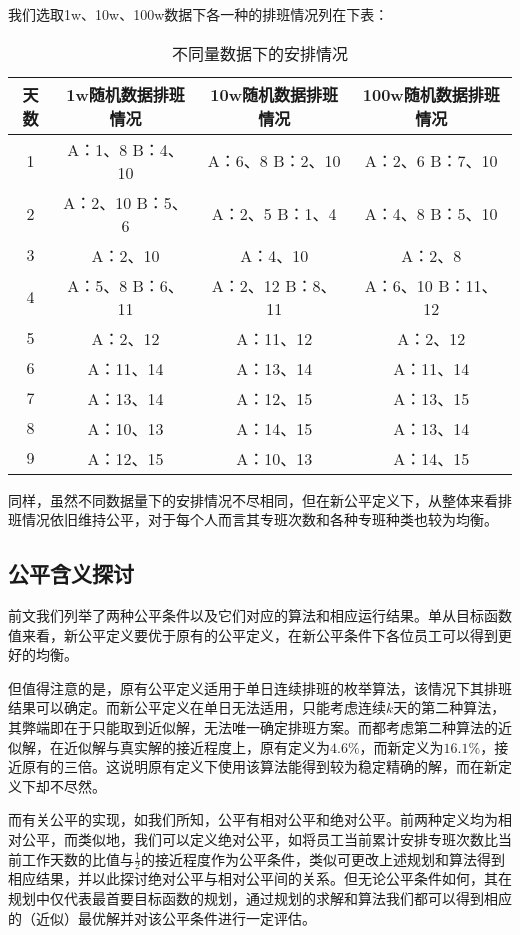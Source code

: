 \documentclass{article}
\begin{document}
	我们选取1w、10w、100w数据下各一种的排班情况列在下表：
	\begin{table}[!h]
		\centering
		\caption{不同量数据下的安排情况}
		\begin{tabular}{|c|c|c|c|}
			\hline
			天数 & 1w随机数据排班情况   & 10w随机数据排班情况   & 100w随机数据排班情况   \\
			\hline
			1  & A：1、8 B：4、10 & A：6、8 B：2、10  & A：2、6 B：7、10   \\
			2  & A：2、10 B：5、6 & A：2、5 B：1、4   & A：4、8 B：5、10   \\
			3  & A：2、10       & A：4、10        & A：2、8          \\
			4  & A：5、8 B：6、11 & A：2、12 B：8、11 & A：6、10 B：11、12 \\
			5  & A：2、12       & A：11、12       & A：2、12         \\
			6  & A：11、14      & A：13、14       & A：11、14        \\
			7  & A：13、14      & A：12、15       & A：13、15        \\
			8  & A：10、13      & A：14、15       & A：13、14        \\
			9  & A：12、15      & A：10、13       & A：14、15       \\
			\hline
		\end{tabular}
	\end{table}
	
	同样，虽然不同数据量下的安排情况不尽相同，但在新公平定义下，从整体来看排班情况依旧维持公平，对于每个人而言其专班次数和各种专班种类也较为均衡。
	
	\subsection{公平含义探讨}
	前文我们列举了两种公平条件以及它们对应的算法和相应运行结果。单从目标函数值来看，新公平定义要优于原有的公平定义，在新公平条件下各位员工可以得到更好的均衡。
	
	但值得注意的是，原有公平定义适用于单日连续排班的枚举算法，该情况下其排班结果可以确定。而新公平定义在单日无法适用，只能考虑连续$k$天的第二种算法，其弊端即在于只能取到近似解，无法唯一确定排班方案。而都考虑第二种算法的近似解，在近似解与真实解的接近程度上，原有定义为$4.6\%$，而新定义为$16.1\%$，接近原有的三倍。这说明原有定义下使用该算法能得到较为稳定精确的解，而在新定义下却不尽然。
	
	而有关公平的实现，如我们所知，公平有相对公平和绝对公平。前两种定义均为相对公平，而类似地，我们可以定义绝对公平，如将员工当前累计安排专班次数比当前工作天数的比值与$\frac{1}{2}$的接近程度作为公平条件，类似可更改上述规划和算法得到相应结果，并以此探讨绝对公平与相对公平间的关系。但无论公平条件如何，其在规划中仅代表最首要目标函数的规划，通过规划的求解和算法我们都可以得到相应的（近似）最优解并对该公平条件进行一定评估。
	
\end{document}
